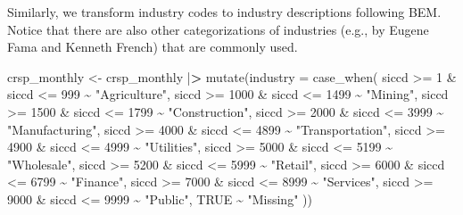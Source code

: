 \documentclass[
]{book}
\newenvironment{Shaded}{\begin{snugshade}}{\end{snugshade}}
\newcommand{\AttributeTok}[1]{\textcolor[rgb]{0.61,0.61,0.61}{#1}}
\newcommand{\ConstantTok}[1]{\textcolor[rgb]{0,0,0}{#1}}
\newcommand{\DecValTok}[1]{\textcolor[rgb]{0.06,0.06,0.06}{#1}}
\newcommand{\ErrorTok}[1]{\textcolor[rgb]{0.14,0.14,0.14}{\textbf{#1}}}
\newcommand{\FunctionTok}[1]{\textcolor[rgb]{0,0,0}{#1}}
\newcommand{\NormalTok}[1]{#1}
\newcommand{\OtherTok}[1]{\textcolor[rgb]{0.37,0.37,0.37}{#1}}
\newcommand{\SpecialCharTok}[1]{\textcolor[rgb]{0,0,0}{#1}}
\newcommand{\StringTok}[1]{\textcolor[rgb]{0.5,0.5,0.5}{#1}}
\begin{document}
Similarly, we transform industry codes to industry descriptions following BEM. Notice that there are also other categorizations of industries (e.g., by Eugene Fama and Kenneth French) that are commonly used.

\begin{Shaded}
\begin{Highlighting}[]
\NormalTok{crsp\_monthly }\OtherTok{\textless{}{-}}\NormalTok{ crsp\_monthly }\SpecialCharTok{|}\ErrorTok{\textgreater{}}
  \FunctionTok{mutate}\NormalTok{(}\AttributeTok{industry =} \FunctionTok{case\_when}\NormalTok{(}
\NormalTok{    siccd }\SpecialCharTok{\textgreater{}=} \DecValTok{1} \SpecialCharTok{\&}\NormalTok{ siccd }\SpecialCharTok{\textless{}=} \DecValTok{999} \SpecialCharTok{\textasciitilde{}} \StringTok{"Agriculture"}\NormalTok{,}
\NormalTok{    siccd }\SpecialCharTok{\textgreater{}=} \DecValTok{1000} \SpecialCharTok{\&}\NormalTok{ siccd }\SpecialCharTok{\textless{}=} \DecValTok{1499} \SpecialCharTok{\textasciitilde{}} \StringTok{"Mining"}\NormalTok{,}
\NormalTok{    siccd }\SpecialCharTok{\textgreater{}=} \DecValTok{1500} \SpecialCharTok{\&}\NormalTok{ siccd }\SpecialCharTok{\textless{}=} \DecValTok{1799} \SpecialCharTok{\textasciitilde{}} \StringTok{"Construction"}\NormalTok{,}
\NormalTok{    siccd }\SpecialCharTok{\textgreater{}=} \DecValTok{2000} \SpecialCharTok{\&}\NormalTok{ siccd }\SpecialCharTok{\textless{}=} \DecValTok{3999} \SpecialCharTok{\textasciitilde{}} \StringTok{"Manufacturing"}\NormalTok{,}
\NormalTok{    siccd }\SpecialCharTok{\textgreater{}=} \DecValTok{4000} \SpecialCharTok{\&}\NormalTok{ siccd }\SpecialCharTok{\textless{}=} \DecValTok{4899} \SpecialCharTok{\textasciitilde{}} \StringTok{"Transportation"}\NormalTok{,}
\NormalTok{    siccd }\SpecialCharTok{\textgreater{}=} \DecValTok{4900} \SpecialCharTok{\&}\NormalTok{ siccd }\SpecialCharTok{\textless{}=} \DecValTok{4999} \SpecialCharTok{\textasciitilde{}} \StringTok{"Utilities"}\NormalTok{,}
\NormalTok{    siccd }\SpecialCharTok{\textgreater{}=} \DecValTok{5000} \SpecialCharTok{\&}\NormalTok{ siccd }\SpecialCharTok{\textless{}=} \DecValTok{5199} \SpecialCharTok{\textasciitilde{}} \StringTok{"Wholesale"}\NormalTok{,}
\NormalTok{    siccd }\SpecialCharTok{\textgreater{}=} \DecValTok{5200} \SpecialCharTok{\&}\NormalTok{ siccd }\SpecialCharTok{\textless{}=} \DecValTok{5999} \SpecialCharTok{\textasciitilde{}} \StringTok{"Retail"}\NormalTok{,}
\NormalTok{    siccd }\SpecialCharTok{\textgreater{}=} \DecValTok{6000} \SpecialCharTok{\&}\NormalTok{ siccd }\SpecialCharTok{\textless{}=} \DecValTok{6799} \SpecialCharTok{\textasciitilde{}} \StringTok{"Finance"}\NormalTok{,}
\NormalTok{    siccd }\SpecialCharTok{\textgreater{}=} \DecValTok{7000} \SpecialCharTok{\&}\NormalTok{ siccd }\SpecialCharTok{\textless{}=} \DecValTok{8999} \SpecialCharTok{\textasciitilde{}} \StringTok{"Services"}\NormalTok{,}
\NormalTok{    siccd }\SpecialCharTok{\textgreater{}=} \DecValTok{9000} \SpecialCharTok{\&}\NormalTok{ siccd }\SpecialCharTok{\textless{}=} \DecValTok{9999} \SpecialCharTok{\textasciitilde{}} \StringTok{"Public"}\NormalTok{,}
    \ConstantTok{TRUE} \SpecialCharTok{\textasciitilde{}} \StringTok{"Missing"}
\NormalTok{  ))}
\end{Highlighting}
\end{Shaded}
\end{document}
